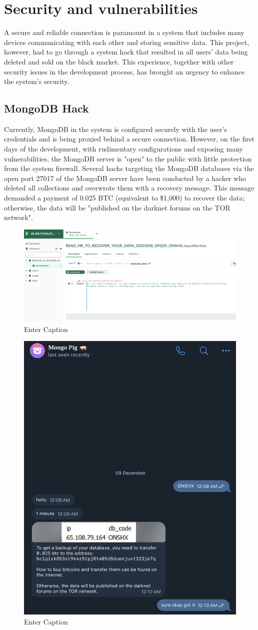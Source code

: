 \documentclass[../Main.tex]{subfiles}
\begin{document}
\section{Security and vulnerabilities}
A secure and reliable connection is paramount in a system that includes many devices communicating with each other and storing sensitive data. This project, however, had to go through a system hack that resulted in all users' data being deleted and sold on the black market. This experience, together with other security issues in the development process, has brought an urgency to enhance the system's security.
\subsection{MongoDB Hack}
Currently, MongoDB in the system is configured securely with the user's credentials and is being proxied behind a secure connection. However, on the first days of the development, with rudimentary configurations and exposing many vulnerabilities, the MongoDB server is "open" to the public with little protection from the system firewall. Several hacks targeting the MongoDB databases via the open port 27017 of the MongoDB server have been conducted by a hacker who deleted all collections and overwrote them with a recovery message. This message demanded a payment of 0.025 BTC (equivalent to \$1,000) to recover the data; otherwise, the data will be "published on the darknet forums on the TOR network".
\begin{figure}[H]
    \centering
    \includegraphics[width=0.9\linewidth]{doc/imgs/mongo-hack.png}
    \caption{Enter Caption}
    \label{fig:enter-label}
\end{figure}
\begin{figure}[H]
    \centering
    \includegraphics[width=0.5\linewidth]{doc/imgs/mongo-pig.png}
    \caption{Enter Caption}
    \label{fig:enter-label}
\end{figure}
 
\end{document}
